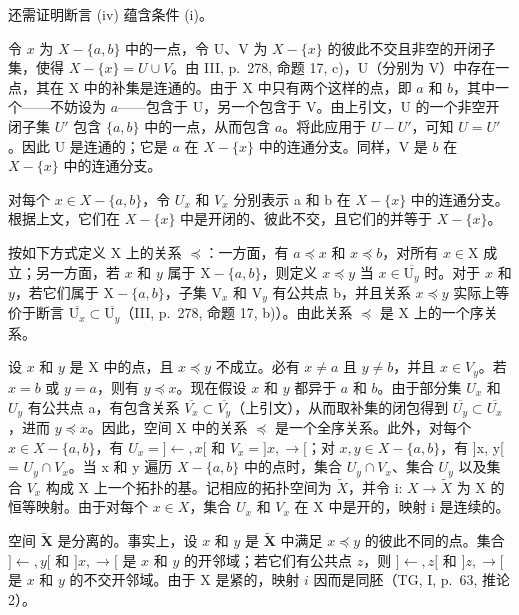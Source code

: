 还需证明断言 (iv) 蕴含条件 (i)。

令 \(x\) 为 \(X - \{a, b\}\) 中的一点，令 U、V 为 \(X - \{x\}\) 的彼此不交且非空的开闭子集，使得 \(X - \{x\} = U \cup V\)。由 III, p.~278, 命题 17, c)，U（分别为 V）中存在一点，其在 X 中的补集是连通的。由于 X 中只有两个这样的点，即 \(a\) 和 \(b\)，其中一个——不妨设为 \(a\)——包含于 U，另一个包含于 V。由上引文，U 的一个非空开闭子集 \(U'\) 包含 \(\{a, b\}\) 中的一点，从而包含 \(a\)。将此应用于 \(U - U'\)，可知 \(U = U'\)。因此 U 是连通的；它是 \(a\) 在 \(X - \{x\}\) 中的连通分支。同样，V 是 \(b\) 在 \(X - \{x\}\) 中的连通分支。

对每个 \(x \in X - \{a, b\}\)，令 \(U_x\) 和 \(V_x\) 分别表示 a 和 b 在 \(X - \{x\}\) 中的连通分支。根据上文，它们在 \(X - \{x\}\) 中是开闭的、彼此不交，且它们的并等于 \(X - \{x\}\)。

按如下方式定义 X 上的关系 \(\preccurlyeq\)：一方面，有 \(a \preccurlyeq x\) 和 \(x \preccurlyeq b\)，对所有 \(x \in \mathrm{X}\) 成立；另一方面，若 \(x\) 和 \(y\) 属于 \(\mathrm{X} - \{a, b\}\)，则定义 \(x \preccurlyeq y\) 当 \(x \in \overline{\mathrm{U}_y}\) 时。对于 \(x\) 和 \(y\)，若它们属于 \(\mathrm{X} - \{a, b\}\)，子集 \(\mathrm{V}_x\) 和 \(\mathrm{V}_y\) 有公共点 b，并且关系 \(x \preccurlyeq y\) 实际上等价于断言 \(\overline{\mathrm{U}_x} \subset \overline{\mathrm{U}_y}\)（III, p.~278, 命题 17, b)）。由此关系 \(\preccurlyeq\) 是 X 上的一个序关系。

设 \(x\) 和 \(y\) 是 X 中的点，且 \(x \preccurlyeq y\) 不成立。必有 \(x \neq a\) 且 \(y \neq b\)，并且 \(x \in V_y\)。若 \(x = b\) 或 \(y = a\)，则有 \(y \preccurlyeq x\)。现在假设 \(x\) 和 \(y\) 都异于 \(a\) 和 \(b\)。由于部分集 \(U_x\) 和 \(U_y\) 有公共点 a，有包含关系 \(\overline{V_x} \subset \overline{V_y}\)（上引文），从而取补集的闭包得到 \(\overline{U_y} \subset \overline{U_x}\)，进而 \(y \preccurlyeq x\)。因此，空间 X 中的关系 \(\preccurlyeq\) 是一个全序关系。此外，对每个 \(x \in X - \{a, b\}\)，有 \(U_x = ] \leftarrow, x[\) 和 \(V_x = ]x, \rightarrow[\)；对 \(x, y \in X - \{a, b\}\)，有 {]}x, y{[} = \(U_y \cap V_x\)。当 x 和 y 遍历 \(X - \{a, b\}\) 中的点时，集合 \(U_y \cap V_x\)、集合 \(U_y\) 以及集合 \(V_x\) 构成 X 上一个拓扑的基。记相应的拓扑空间为 \(\widetilde{X}\)，并令 i: \(X \to \widetilde{X}\) 为 X 的恒等映射。由于对每个 \(x \in X\)，集合 \(U_x\) 和 \(V_x\) 在 X 中是开的，映射 i 是连续的。

空间 \(\widetilde{\mathbf{X}}\) 是分离的。事实上，设 \(x\) 和 \(y\) 是 \(\widetilde{\mathbf{X}}\) 中满足 \(x \preccurlyeq y\) 的彼此不同的点。集合 \(]\leftarrow, y[\) 和 \(]x, \rightarrow[\) 是 \(x\) 和 \(y\) 的开邻域；若它们有公共点 \(z\)，则 \(]\leftarrow, z[\) 和 \(]z, \rightarrow[\) 是 \(x\) 和 \(y\) 的不交开邻域。由于 X 是紧的，映射 \(i\) 因而是同胚（TG, I, p.~63, 推论 2）。

